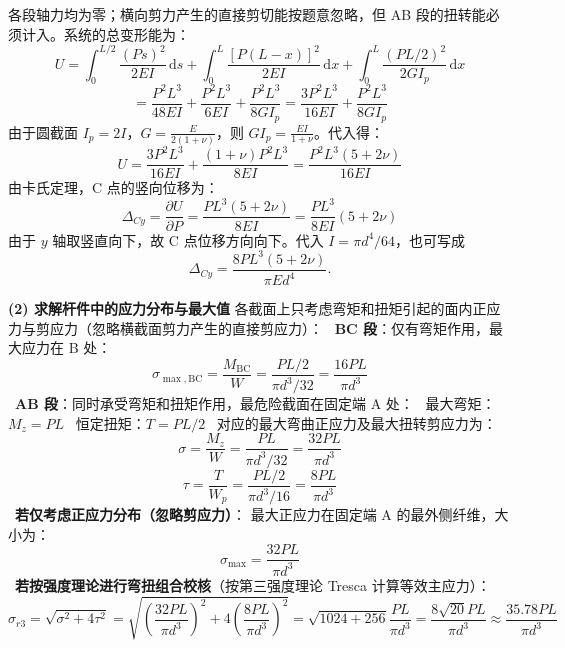 \documentclass[11pt,a4paper]{ctexrep}
\newcommand{\diff}{\,\mathrm{d}}
\begin{document}
{各段轴力均为零；横向剪力产生的直接剪切能按题意忽略，但 AB 段的扭转能必须计入。系统的总变形能为：
\[
U = \int_0^{L/2} \frac{(P s)^2}{2 EI} \diff s + \int_0^L \frac{[P(L-x)]^2}{2 EI} \diff x + \int_0^L \frac{(PL/2)^2}{2 G I_p} \diff x
\]
\[
= \frac{P^2 L^3}{48 EI} + \frac{P^2 L^3}{6 EI} + \frac{P^2 L^3}{8 G I_p} = \frac{3 P^2 L^3}{16 EI} + \frac{P^2 L^3}{8 G I_p}
\]
由于圆截面 $I_p = 2 I$，$G = \frac{E}{2(1+\nu)}$，则 $G I_p = \frac{E I}{1+\nu}$。代入得：
\[
U = \frac{3 P^2 L^3}{16 EI} + \frac{(1+\nu) P^2 L^3}{8 EI} = \frac{P^2 L^3 (5 + 2\nu)}{16 EI}
\]
由卡氏定理，C 点的竖向位移为：
\[
\Delta_{Cy} = \frac{\partial U}{\partial P} = \frac{P L^3 (5 + 2\nu)}{8 EI} = \frac{P L^3}{8 EI} (5 + 2\nu)
\]
由于 $y$ 轴取竖直向下，故 C 点位移方向向下。代入 $I=\pi d^4/64$，也可写成
\[
    \Delta_{Cy}=\frac{8PL^3(5+2\nu)}{\pi E d^4}.
\]

\textbf{(2) 求解杆件中的应力分布与最大值}
各截面上只考虑弯矩和扭矩引起的面内正应力与剪应力（忽略横截面剪力产生的直接剪应力）：
\noindent\textbullet\ \textbf{BC 段}：仅有弯矩作用，最大应力在 B 处：
  \[
  \sigma_{\max, \mathrm{BC}} = \frac{M_{\mathrm{BC}}}{W} = \frac{P L / 2}{\pi d^3 / 32} = \frac{16 PL}{\pi d^3}
  \]
\noindent\textbullet\ \textbf{AB 段}：同时承受弯矩和扭矩作用，最危险截面在固定端 A 处：
\noindent\textbullet\ 最大弯矩：$M_z = PL$
\noindent\textbullet\ 恒定扭矩：$T = PL/2$
\noindent\textbullet\ 对应的最大弯曲正应力及最大扭转剪应力为：
    \[
    \sigma = \frac{M_z}{W} = \frac{PL}{\pi d^3 / 32} = \frac{32 PL}{\pi d^3}
    \]
    \[
    \tau = \frac{T}{W_p} = \frac{PL/2}{\pi d^3 / 16} = \frac{8 PL}{\pi d^3}
    \]
\noindent\textbullet\ \textbf{若仅考虑正应力分布（忽略剪应力）}：
    最大正应力在固定端 A 的最外侧纤维，大小为：
    \[
    \sigma_{\max} = \frac{32 PL}{\pi d^3}
    \]
\noindent\textbullet\ \textbf{若按强度理论进行弯扭组合校核}（按第三强度理论 Tresca 计算等效主应力）：
    \[
    \sigma_{r3} = \sqrt{\sigma^2 + 4\tau^2} = \sqrt{\left(\frac{32 PL}{\pi d^3}\right)^2 + 4\left(\frac{8 PL}{\pi d^3}\right)^2} = \sqrt{1024 + 256} \frac{PL}{\pi d^3} = \frac{8\sqrt{20} PL}{\pi d^3} \approx \frac{35.78 PL}{\pi d^3}
    \]


}
\end{document}

